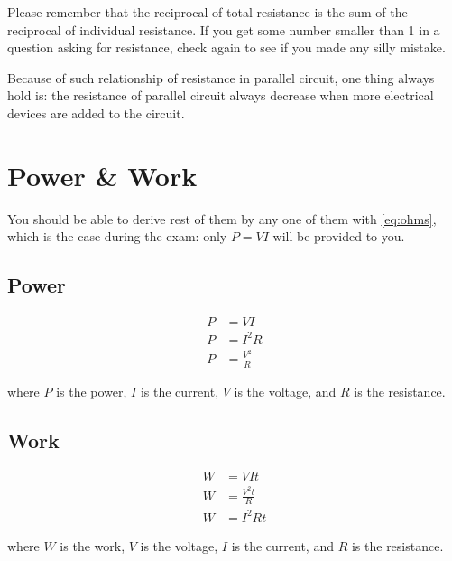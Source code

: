 \documentclass{article}
\begin{document}
Please remember that the reciprocal of total resistance is the sum of the reciprocal of
individual resistance. If you get some number smaller than 1 in a question asking for
resistance, check again to see if you made any silly mistake.

Because of such relationship of resistance in parallel circuit, one thing always hold
is: the resistance of parallel circuit always decrease when more electrical devices are
added to the circuit.

\section{Power \& Work}

You should be able to derive rest of them by any one of them with \ref{eq:ohms}, which
is the case during the exam: only $P=VI$ will be provided to you.

\subsection{Power}

\begin{equation}
    \begin{split}
        P &= VI \\
        P &= I^2R\\
        P &= \frac{V^2}{R}
    \end{split}
    \label{eq:power}
\end{equation}

where $P$ is the power, $I$ is the current, $V$ is the voltage, and $R$ is the resistance.

\subsection{Work}

\begin{equation}
    \begin{split}
        W &= VIt\\
        W &= \frac{V^2t}{R} \\
        W &= I^2Rt
    \end{split}
    \label{eq:work}
\end{equation}

where $W$ is the work, $V$ is the voltage, $I$ is the current, and $R$ is the resistance.
\end{document}
